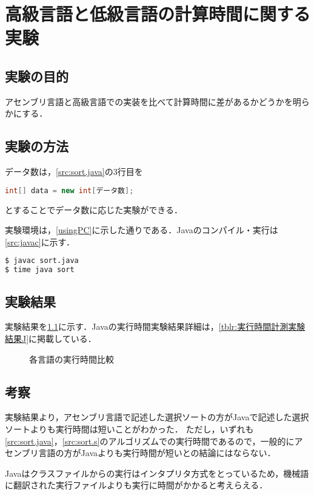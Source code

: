 \chapter{高級言語と低級言語の計算時間に関する実験}\label{chap4}
\section{実験の目的}
アセンブリ言語と高級言語での実装を比べて計算時間に差があるかどうかを明らかにする．
\section{実験の方法}
データ数は，\ref{src:sort.java}の3行目を
\begin{lstlisting}[caption={}, label={}, language={Java}, frame={none},numbers={none}]
int[] data = new int[データ数];
\end{lstlisting}
とすることでデータ数に応じた実験ができる．\par
実験環境は，\ref{usingPC}に示した通りである．{\ttfamily Java}のコンパイル・実行は\ref{src:javac}に示す．
\begin{lstlisting}[caption={{\ttfamily Java}コンパイル・実行時間の計測}, label={src:javac}, language={Bash},frame={single},numbers={none}]
$ javac sort.java
$ time java sort
\end{lstlisting}
\section{実験結果}
実験結果を\ref{fig:比較}に示す．{\ttfamily Java}の実行時間実験結果詳細は，\ref{tblr:実行時間計測実験結果J}に掲載している．
\begin{figure}[htb]
   \centering
   \caption{各言語の実行時間比較}
   \label{fig:比較}
\end{figure}
\section{考察}
実験結果より，アセンブリ言語で記述した選択ソートの方が{\ttfamily Java}で記述した選択ソートよりも実行時間は短いことがわかった．
ただし，いずれも\ref{src:sort.java}，\ref{src:sort.s}のアルゴリズムでの実行時間であるので，一般的にアセンブリ言語の方が{\ttfamily Java}よりも実行時間が短いとの結論にはならない．\par
{\ttfamily Java}はクラスファイルからの実行はインタプリタ方式をとっているため，機械語に翻訳された実行ファイルよりも実行に時間がかかると考えらえる．
